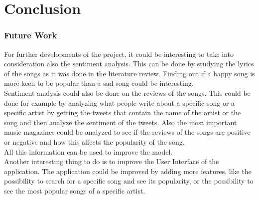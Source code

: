 \chapter{Conclusion}

\subsection{Future Work}
For further developments of the project, it could be interesting to take into consideration also the sentiment analysis.
This can be done by studying the lyrics of the songs as it was done in the literature review. 
Finding out if a happy song is more keen to be popular than a sad song could be interesting.\\
Sentiment analysis could also be done on the reviews of the songs.
This could be done for example by analyzing what people write about a specific song or a specific artist by getting the tweets that contain the name of the artist or the song and then analyze the sentiment of the tweets. Also the most important music magazines could be analyzed to see if the reviews of the songs are positive or negative and how this affects the popularity of the song.\\
All this information can be used to improve the model.\\
Another interesting thing to do is to improve the User Interface of the application. The application could be improved by adding more features, like the possibility to search for a specific song and see its popularity, or the possibility to see the most popular songs of a specific artist.\\



